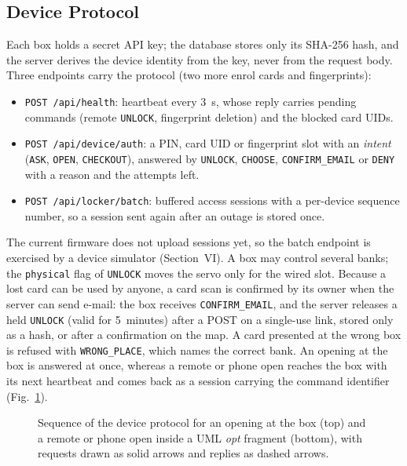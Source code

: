 \subsection{Device Protocol}

Each box holds a secret API key; the database stores only its SHA-256 hash, and the server derives the device
identity from the key, never from the request body. Three endpoints carry the protocol (two more enrol cards and
fingerprints):
\begin{itemize}
  \item \texttt{POST /api/health}: heartbeat every 3~s, whose reply carries pending commands (remote
        \texttt{UNLOCK}, fingerprint deletion) and the blocked card UIDs.
  \item \texttt{POST /api/device/auth}: a PIN, card UID or fingerprint slot with an \emph{intent} (\texttt{ASK},
        \texttt{OPEN}, \texttt{CHECKOUT}), answered by \texttt{UNLOCK}, \texttt{CHOOSE}, \texttt{CONFIRM\_EMAIL} or
        \texttt{DENY} with a reason and the attempts left.
  \item \texttt{POST /api/locker/batch}: buffered access sessions with a per-device sequence number, so a session sent
        again after an outage is stored once.
\end{itemize}
The current firmware does not upload sessions yet, so the batch endpoint is exercised by a device simulator
(Section~VI). A box may control several banks; the \texttt{physical} flag of \texttt{UNLOCK} moves the servo only for
the wired slot. Because a lost card can be used by anyone, a card scan is confirmed by its owner when the server can
send e-mail: the box receives \texttt{CONFIRM\_EMAIL}, and the server releases a held \texttt{UNLOCK} (valid for
5~minutes) after a POST on a single-use link, stored only as a hash, or after a confirmation on the map. A card
presented at the wrong box is refused with \texttt{WRONG\_PLACE}, which names the correct bank. An opening at the box
is answered at once, whereas a remote or phone open reaches the box with its next heartbeat and comes back as a session
carrying the command identifier (Fig.~\ref{fig:seq}).

\begin{figure}[!htbp]
\centering

\caption{Sequence of the device protocol for an opening at the box (top) and a remote or phone open inside a UML
\emph{opt} fragment (bottom), with requests drawn as solid arrows and replies as dashed arrows.}
\label{fig:seq}
\end{figure}

